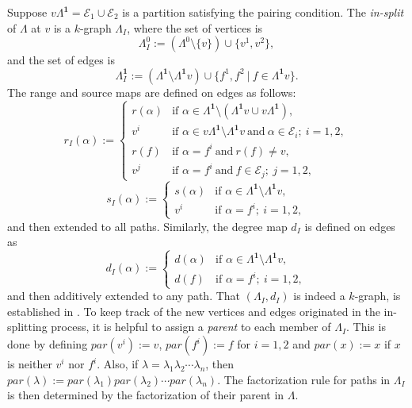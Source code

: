 \documentclass[12pt]{amsart}
\theoremstyle{definition}
\theoremstyle{remark}
\begin{document}
Suppose $v\Lambda^\mathbf{1}=\mathcal{E}_1\cup \mathcal{E}_2$ is a partition satisfying the pairing condition. The \emph{in-split} of $\Lambda$ at $v$ is a $k$-graph $\Lambda_I$, where the set of vertices is \[\Lambda_I^0:=(\Lambda^0\setminus \{v\})\cup \{v^1,v^2\},\] and the set of edges is \[\Lambda_I^\mathbf{1}:=(\Lambda^\mathbf{1}\setminus \Lambda^\mathbf{1} v)\cup \{f^1,f^2~|~f\in \Lambda^\mathbf{1} v\}.\] The range and source maps are defined on edges as follows:
$$r_I(\alpha):=
	\left\{
	\begin{array}{llll}
		r(\alpha)  & \mbox{if } \alpha\in \Lambda^\mathbf{1}\setminus (\Lambda^\mathbf{1}v \cup v\Lambda^\mathbf{1}), \\
		v^i  & \mbox{if } \alpha\in v\Lambda^\mathbf{1}\setminus \Lambda^\mathbf{1}v ~\mbox{and}~ \alpha\in \mathcal{E}_i;~ i=1,2,\\
            r(f)  & \mbox{if } \alpha=f^i ~\mbox{and}~ r(f)\neq v,\\
        v^j & \mbox{if } \alpha=f^i ~\mbox{and}~ f\in \mathcal{E}_j;~ j=1,2,
	\end{array}
	\right.$$
$$s_I(\alpha):=
	\left\{
	\begin{array}{ll}
		s(\alpha)  & \mbox{if } \alpha\in \Lambda^\mathbf{1}\setminus \Lambda^\mathbf{1}v, \\
		v^i  & \mbox{if } \alpha=f^i;~i=1,2,
	\end{array}
	\right.$$
and then extended to all paths. Similarly, the degree map $d_I$ is defined on edges as 
$$d_I(\alpha):=
	\left\{
	\begin{array}{ll}
		d(\alpha)  & \mbox{if } \alpha\in \Lambda^\mathbf{1}\setminus \Lambda^\mathbf{1}v, \\
		d(f)  & \mbox{if } \alpha=f^i;~i=1,2,
	\end{array}
	\right.$$
and then additively extended to any path. That $(\Lambda_I,d_I)$ is indeed a $k$-graph, is established in \cite[Theorem 3.8]{EFGGGP}. To keep track of the new vertices and edges originated in the in-splitting process, it is helpful to assign a \emph{parent} to each member of $\Lambda_I$. This is done by defining $par(v^i):=v$, $par(f^i):=f$ for $i=1,2$ and $par(x):=x$ if $x$ is neither $v^i$ nor $f^i$. Also, if $\lambda=\lambda_1\lambda_2\cdots \lambda_n$, then $par(\lambda):=par(\lambda_1)par(\lambda_2)\cdots par(\lambda_n)$. The factorization rule for paths in $\Lambda_I$ is then determined by the factorization of their parent in $\Lambda$. 
\end{document}
